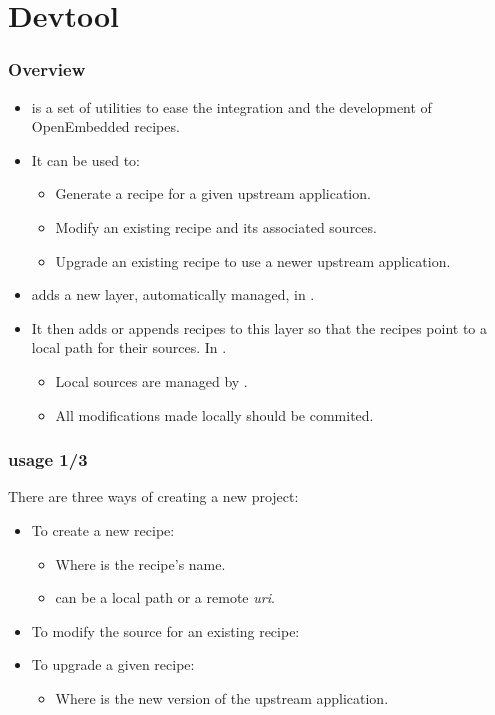 \section{Devtool}

\begin{frame}
  \frametitle{Overview}
  \begin{itemize}
    \item {} is a set of utilities to ease the integration
    and the development of OpenEmbedded recipes.
    \item It can be used to:
      \begin{itemize}
        \item Generate a recipe for a given upstream application.
        \item Modify an existing recipe and its associated sources.
        \item Upgrade an existing recipe to use a newer upstream
          application.
      \end{itemize}
    \item {} adds a new layer, automatically managed, in
      .
    \item It then adds or appends recipes to this layer so that the
      recipes point to a local path for their sources. In
      .
      \begin{itemize}
        \item Local sources are managed by .
        \item All modifications made locally should be commited.
      \end{itemize}
  \end{itemize}
\end{frame}

\begin{frame}
  \frametitle{ usage 1/3}
  There are three ways of creating a new  project:
  \begin{itemize}
    \item To create a new recipe:
      \begin{itemize}
        \item Where  is the recipe's name.
        \item {} can be a local path or a remote {\em
          uri}.
      \end{itemize}
    \item To modify the source for an existing recipe: 
    \item To upgrade a given recipe:
      \begin{itemize}
        \item Where  is the new version of the upstream
          application.
      \end{itemize}
  \end{itemize}
\end{frame}

